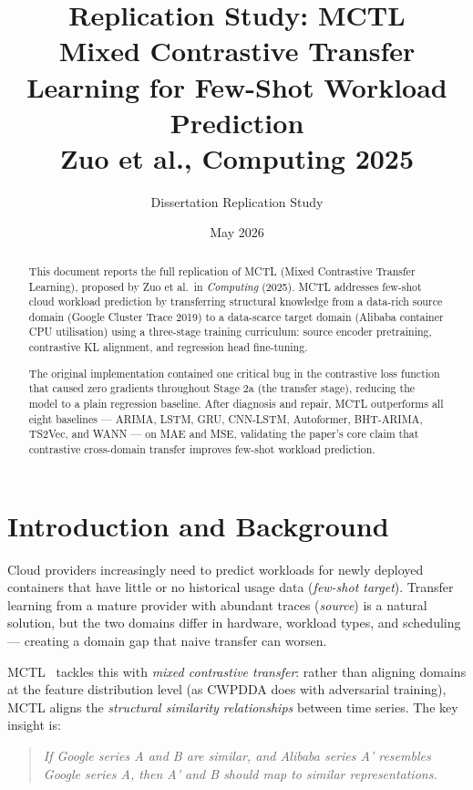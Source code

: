 \documentclass[12pt,a4paper]{article}
\title{%
    \textbf{Replication Study: MCTL}\\[0.4em]
    \large Mixed Contrastive Transfer Learning for Few-Shot Workload Prediction\\[0.3em]
    \normalsize Zuo et al., Computing 2025
}
\author{Dissertation Replication Study}
\date{May 2026}
\begin{document}
\maketitle
\tableofcontents
\newpage

\begin{abstract}
This document reports the full replication of MCTL (Mixed Contrastive Transfer
Learning), proposed by Zuo et al.\ in \textit{Computing} (2025).
MCTL addresses few-shot cloud workload prediction by transferring structural
knowledge from a data-rich source domain (Google Cluster Trace 2019) to a
data-scarce target domain (Alibaba container CPU utilisation) using a
three-stage training curriculum: source encoder pretraining, contrastive KL
alignment, and regression head fine-tuning.

The original implementation contained one critical bug in the contrastive loss
function that caused zero gradients throughout Stage 2a (the transfer stage),
reducing the model to a plain regression baseline.  After diagnosis and repair,
MCTL outperforms all eight baselines — ARIMA, LSTM, GRU, CNN-LSTM, Autoformer,
BHT-ARIMA, TS2Vec, and WANN — on MAE and MSE, validating the paper's core claim
that contrastive cross-domain transfer improves few-shot workload prediction.
\end{abstract}

\section{Introduction and Background}

Cloud providers increasingly need to predict workloads for newly deployed
containers that have little or no historical usage data (\emph{few-shot target}).
Transfer learning from a mature provider with abundant traces (\emph{source})
is a natural solution, but the two domains differ in hardware, workload types,
and scheduling — creating a domain gap that naive transfer can worsen.

MCTL~\cite{zuo2025mctl} tackles this with \emph{mixed contrastive transfer}:
rather than aligning domains at the feature distribution level (as CWPDDA does
with adversarial training), MCTL aligns the \emph{structural similarity
relationships} between time series.  The key insight is:

\begin{quote}
\textit{If Google series A and B are similar, and Alibaba series A' resembles
Google series A, then A' and B should map to similar representations.}
\end{quote}
\end{document}

